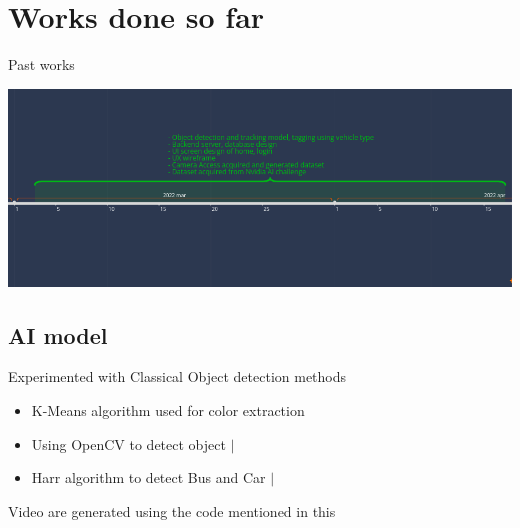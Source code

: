 \documentclass{beamer}
\newcommand{\link}[2]{\href{#1}{\textit{\color{blue}{#2}}}}%
\begin{document}

	\section{Works done so far}
	\begin{frame}{Past works}
		\begin{center}
			\includegraphics[width=1\linewidth]{res/timeline_old}
		\end{center}
		
	\end{frame}
	\subsection{AI model}
	\begin{frame}{Experimented with Classical Object detection methods}
		\begin{itemize}
			\item K-Means algorithm used for color extraction
				\link{https://github.com/Project-Dragon-Fly/tutorial-trials/blob/tutorial\_testing/Color\%20detection.ipynb}{notebook}
			
			\item Using OpenCV to detect object  
				\link{https://github.com/Project-Dragon-Fly/tutorial-trials/blob/tutorial\_testing/OpenCV-image-difference.ipynb}{notebook} $|$ 
				\link{https://drive.google.com/file/d/1-2EAoUBxMzfnMO3tVJFJ0qvGnXMFp4zL/view}{video}
			
			\item Harr algorithm to detect Bus and Car
				\link{https://github.com/Project-Dragon-Fly/tutorial-trials/blob/tutorial\_testing/OpenCV\%20-\%20Haar\%20algo.ipynb}{notebook} $|$
				\link{https://drive.google.com/file/d/1XYbVf6I2ZJSSdO2SsZECK9rNoYQwROM9/view}{video}
		\end{itemize}
		\begin{small}
			Video are generated using the code mentioned in this \link{https://github.com/Project-Dragon-Fly/tutorial-trials/blob/tutorial\_testing/Detection\_video\_generator.ipynb}{notebook}
		\end{small}
	\end{frame}
\end{document}
